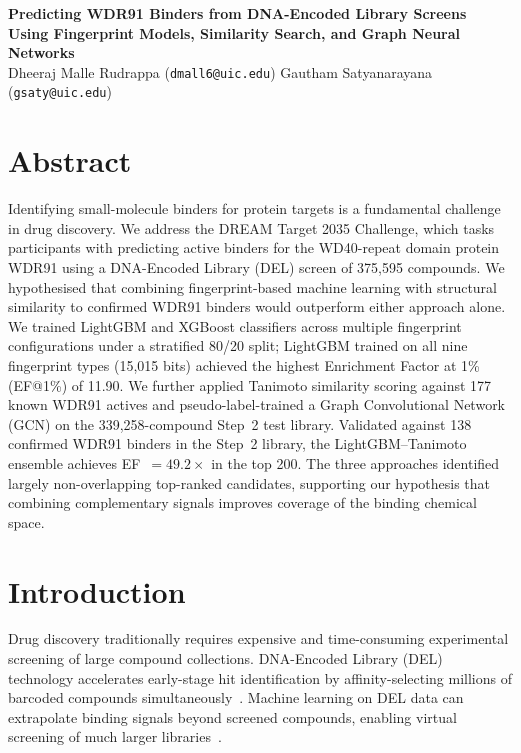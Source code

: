 \documentclass[10pt, letterpaper]{article}
\begin{document}
\begin{center}
{\large \textbf{Predicting WDR91 Binders from DNA-Encoded Library Screens\\
Using Fingerprint Models, Similarity Search, and Graph Neural Networks}}\\[8pt]
Dheeraj Malle Rudrappa (\texttt{dmall6@uic.edu}) \quad
Gautham Satyanarayana (\texttt{gsaty@uic.edu})
\end{center}

\section*{Abstract}
Identifying small-molecule binders for protein targets is a fundamental challenge in drug discovery. We address the DREAM Target 2035 Challenge, which tasks participants with predicting active binders for the WD40-repeat domain protein WDR91 using a DNA-Encoded Library (DEL) screen of 375,595 compounds. We hypothesised that combining fingerprint-based machine learning with structural similarity to confirmed WDR91 binders would outperform either approach alone. We trained LightGBM and XGBoost classifiers across multiple fingerprint configurations under a stratified 80/20 split; LightGBM trained on all nine fingerprint types (15,015 bits) achieved the highest Enrichment Factor at 1\% (EF@1\%) of 11.90. We further applied Tanimoto similarity scoring against 177 known WDR91 actives and pseudo-label-trained a Graph Convolutional Network (GCN) on the 339,258-compound Step~2 test library. Validated against 138 confirmed WDR91 binders in the Step~2 library, the LightGBM--Tanimoto ensemble achieves EF~$= 49.2\times$ in the top 200. The three approaches identified largely non-overlapping top-ranked candidates, supporting our hypothesis that combining complementary signals improves coverage of the binding chemical space.

\section{Introduction}
Drug discovery traditionally requires expensive and time-consuming experimental screening of large compound collections. DNA-Encoded Library (DEL) technology accelerates early-stage hit identification by affinity-selecting millions of barcoded compounds simultaneously~\cite{Goodnow2017}. Machine learning on DEL data can extrapolate binding signals beyond screened compounds, enabling virtual screening of much larger libraries~\cite{McCloskey2020}.
\end{document}
